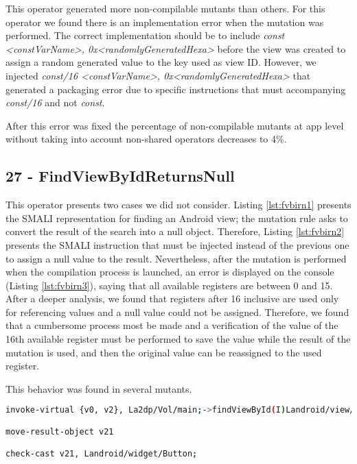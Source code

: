 This operator generated more non-compilable mutants than others. For this operator we found there is an implementation error when the mutation was performed. The correct implementation should be to include \textit{const <constVarName>, 0x<randomlyGeneratedHexa>} before the view was created to assign a random generated value to the key used as view ID. However, we injected \textit{const/16 <constVarName>, 0x<randomlyGeneratedHexa>} that generated a packaging error due to specific instructions that must accompanying \textit{const/16} and not \textit{const}.

After this error was fixed the percentage of non-compilable mutants at app level without taking into account non-shared operators decreases to 4\%.

\subsection{27 - FindViewByIdReturnsNull}

This operator presents two cases we did not consider. Listing \ref{lst:fvbirn1} presents the SMALI representation for finding an Android view; the mutation rule asks to convert the result of the search into a null object. Therefore, Listing \ref{lst:fvbirn2} presents the  SMALI instruction that must be injected instead of the previous one to assign a null value to the result. Nevertheless, after the mutation is performed when the compilation process is launched, an error is displayed on the console (Listing \ref{lst:fvbirn3}), saying that all available registers are between 0 and 15. After a deeper analysis, we found that registers after 16 inclusive are used only for referencing values and a null value could not be assigned. Therefore, we found that a cumbersome process most be made and a verification of the value of the 16th available register must be performed to save the value while the result of the mutation is used, and then the original value can be reassigned to the used register.

This behavior was found in several mutants.

\begin{minipage}{\textwidth}
	\begin{lstlisting}[language={sh}, label={lst:fvbirn1}, caption={SMALI representation of findByViewID method call}, numbers=none]
invoke-virtual {v0, v2}, La2dp/Vol/main;->findViewById(I)Landroid/view/View;

move-result-object v21

check-cast v21, Landroid/widget/Button;
	\end{lstlisting}
\end{minipage}\\

